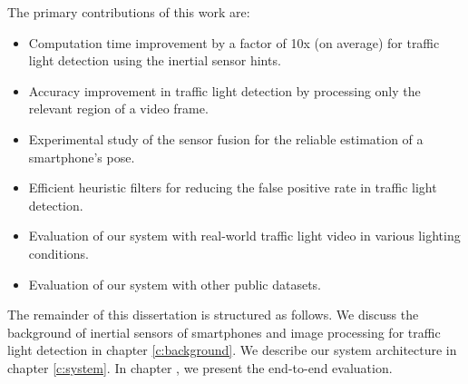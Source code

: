 The primary contributions of this work are:

\begin{itemize}
\item Computation time improvement by a factor of 10x (on average) for traffic light detection using the inertial sensor hints. 
\item Accuracy improvement in traffic light detection by processing only the relevant region of a video frame. 
\item Experimental study of the sensor fusion for the reliable estimation of a smartphone's pose. 
\item Efficient heuristic filters for reducing the false positive rate in traffic light detection.
\item Evaluation of our system with real-world traffic light video in various lighting conditions. 
\item Evaluation of our system with other public datasets.
  

\end{itemize}

The remainder of this dissertation is structured as follows.
We discuss the background of inertial sensors of smartphones and image processing for traffic light detection in chapter \ref{c:background}.
We describe our system architecture in chapter \ref{c:system}.
In chapter , we present the end-to-end evaluation.
